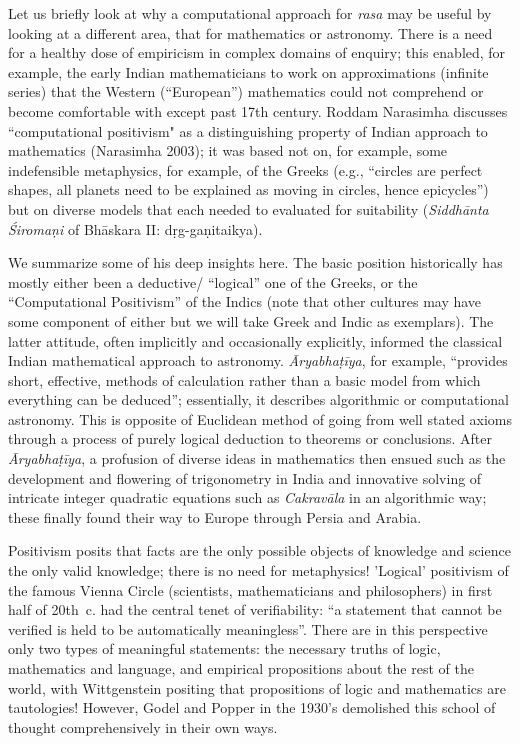 {Let us briefly look at why a computational approach for \textsl{rasa} may be useful by looking at a different area, that for mathematics or astronomy. There is a need for a healthy dose of empiricism in complex domains of enquiry; this enabled, for example, the early Indian mathematicians to work on approximations (infinite series) that the Western (“European”) mathematics could not comprehend or become comfortable with except past 17th century. Roddam Narasimha discusses ``computational positivism" as a distinguishing property of Indian approach to mathematics (Narasimha 2003); it was based not on, for example, some indefensible metaphysics, for example, of the Greeks (e.g., “circles are perfect shapes, all planets need to be explained as moving in circles, hence epicycles”) but on diverse models that each needed to evaluated for suitability (\textsl{Siddhānta Śiromaṇi} of Bhāskara II: dṛg-gaṇitaikya). 

We summarize some of his deep insights here. The basic position historically has mostly either been a deductive/ “logical” one of the Greeks, or the “Computational Positivism” of the Indics (note that other cultures may have some component of either but we will take Greek and Indic as exemplars). The latter attitude, often implicitly and occasionally explicitly, informed the classical Indian mathematical approach to astronomy. \textsl{Āryabhaṭīya}, for example, “provides short, effective, methods of calculation rather than a basic model from which everything can be deduced”; essentially, it describes algorithmic or computational astronomy. This is opposite of Euclidean method of going from well stated axioms through a process of purely logical deduction to theorems or conclusions. After \textsl{Āryabhaṭīya}, a profusion of diverse ideas in mathematics then ensued such as the development and flowering of trigonometry in India and innovative solving of intricate integer quadratic equations such as \textsl{Cakravāla} in an algorithmic way; these finally found their way to Europe through Persia and Arabia.

Positivism posits that facts are the only possible objects of knowledge and science the only valid knowledge; there is no need for metaphysics! 'Logical' positivism of the famous Vienna Circle (scientists, mathematicians and philosophers) in first half of 20th~c. had the central tenet of verifiability: “a statement that cannot be verified is held to be automatically meaningless”. There are in this perspective only two types of meaningful statements: the necessary truths of logic, mathematics and language, and empirical propositions about the rest of the world, with Wittgenstein positing that propositions of logic and mathematics are tautologies! However, Godel and Popper in the 1930’s demolished this school of thought comprehensively in their own ways. 

}

